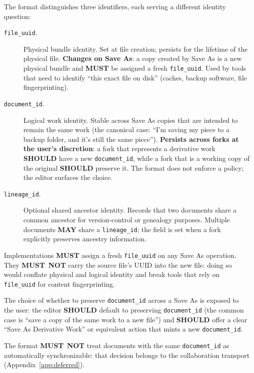 \documentclass[11pt,letterpaper]{report}
\newcounter{requirement}[chapter]
\newcommand{\MUST}{\textbf{MUST}}
\newcommand{\MUSTNOT}{\textbf{MUST}\nobreak\ \textbf{NOT}}
\newcommand{\SHOULD}{\textbf{SHOULD}}
\newcommand{\MAY}{\textbf{MAY}}
\begin{document}
The format distinguishes three identifiers, each serving a
different identity question:

\begin{description}
  \item[\texttt{file\_uuid}.] Physical bundle identity. Set at
    file creation; persists for the lifetime of the physical
    file. \textbf{Changes on Save As}: a copy created by Save As
    is a new physical bundle and \MUST{} be assigned a fresh
    \texttt{file\_uuid}. Used by tools that need to identify
    ``this exact file on disk'' (caches, backup software, file
    fingerprinting).
  \item[\texttt{document\_id}.] Logical work identity. Stable
    across Save As copies that are intended to remain the same
    work (the canonical case: ``I'm saving my piece to a backup
    folder, and it's still the same piece''). \textbf{Persists
    across forks at the user's discretion}: a fork that
    represents a derivative work \SHOULD{} have a new
    \texttt{document\_id}, while a fork that is a working copy
    of the original \SHOULD{} preserve it. The format does not
    enforce a policy; the editor surfaces the choice.
  \item[\texttt{lineage\_id}.] Optional shared ancestor identity.
    Records that two documents share a common ancestor for
    version-control or genealogy purposes. Multiple documents
    \MAY{} share a \texttt{lineage\_id}; the field is set when a
    fork explicitly preserves ancestry information.
\end{description}

\begin{requirement}
  \label{req:format:file-document-lineage-identity}
  Implementations \MUST{} assign a fresh \texttt{file\_uuid} on
  any Save As operation. They \MUSTNOT{} carry the source file's
  UUID into the new file: doing so would conflate physical and
  logical identity and break tools that rely on
  \texttt{file\_uuid} for content fingerprinting.

  The choice of whether to preserve \texttt{document\_id} across
  a Save As is exposed to the user: the editor \SHOULD{} default
  to preserving \texttt{document\_id} (the common case is
  ``save a copy of the same work to a new file'') and \SHOULD{}
  offer a clear ``Save As Derivative Work'' or equivalent action
  that mints a new \texttt{document\_id}.

  The format \MUSTNOT{} treat documents with the same
  \texttt{document\_id} as automatically synchronizable: that
  decision belongs to the collaboration transport
  (Appendix~\ref{app:deferred}).
\end{requirement}
\end{document}
